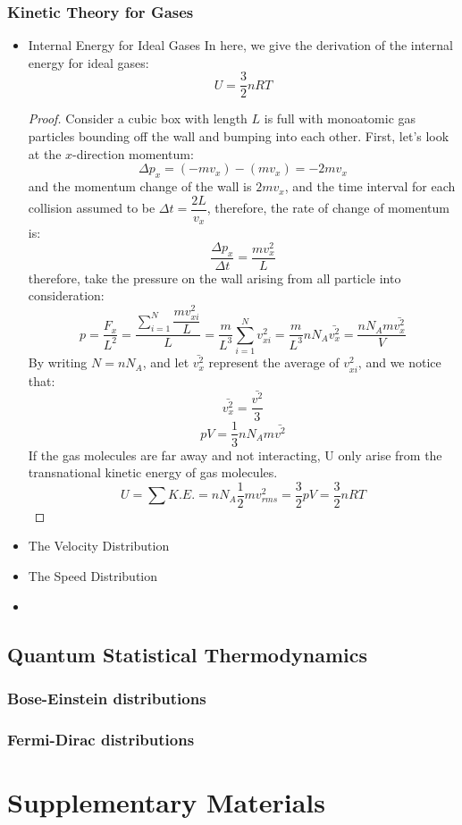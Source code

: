\documentclass[UTF8]{book}
\begin{document}
\subsection{Kinetic Theory for Gases}
\begin{itemize}
\item  {Internal Energy for Ideal Gases}
 {In here, we give the derivation of the internal energy for ideal gases: }
$$U=\dfrac{3}{2}nRT$$
\begin{proof}
 {Consider a cubic box with length $L$ is full with monoatomic gas particles bounding off the wall and bumping into each other. First, let's look at the $x$-direction momentum:}
$$\Delta p_x=(-mv_x)-(mv_x)=-2mv_x$$
 {and the momentum change of the wall is $2mv_x$, and the time interval for each collision assumed to be $\Delta t=\dfrac{2L}{v_x}$, therefore, the rate of change of momentum is:}
$$\dfrac{\Delta p_x}{\Delta t}=\dfrac{mv_x^2}{L}$$
 {therefore, take the pressure on the wall arising from all particle into consideration:}
$$p=\dfrac{F_x}{L^2}=\dfrac{\sum_{i=1}^{N}\dfrac{mv_{xi}^2}{L}}{L}=\dfrac{m}{L^3}\sum_{i=1}^{N}v_{xi}^2=\dfrac{m}{L^3}nN_A\bar{v_x^2}=\dfrac{nN_Am\bar{v_x^2}}{V}$$
 {By writing $N=nN_A$, and let $\bar{v_x^2}$ represent the average of $v_{xi}^2$, and we notice that:}
$$\bar{v_x^2}=\dfrac{\bar{v^2}}{3}$$
$$pV=\dfrac{1}{3}nN_Am\bar{v^2}$$
 {If the gas molecules are far away and not interacting, U only arise from the transnational kinetic energy of gas molecules.}
$$U=\sum K.E.=nN_A\dfrac{1}{2}mv_{rms}^2=\dfrac{3}{2}pV=\dfrac{3}{2}nRT$$
\end{proof}
\item  {The Velocity Distribution}

\item  {The Speed Distribution}
\item 
\end{itemize}

\section{Quantum Statistical Thermodynamics}
\subsection{Bose-Einstein distributions}
\subsection{Fermi-Dirac distributions}
\pagebreak
\chapter{Supplementary Materials}
\end{document}
